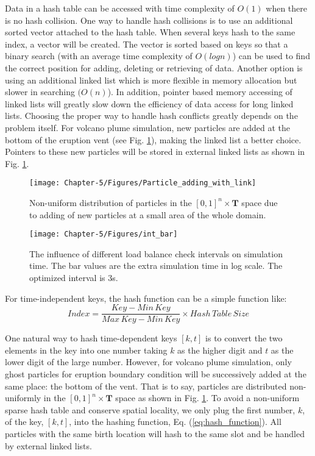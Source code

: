 Data in a hash table can be accessed with time complexity of $O(1)$ when there is no hash collision. One way to handle hash collisions is to use an additional sorted vector attached to the hash table. When several keys hash to the same index, a vector will be created. The vector is sorted based on keys so that a binary search (with an average time complexity of $O(log n)$) can be used to find the correct position for adding, deleting or retrieving of data. Another option is using an additional linked list which is more flexible in memory allocation but slower in searching $(O(n)$). In addition, pointer based memory accessing of linked lists will greatly slow down the efficiency of data access for long linked lists. Choosing the proper way to handle hash conflicts greatly depends on the problem itself. For volcano plume simulation, new particles are added at the bottom of the eruption vent (see Fig. \ref{fig:Particle_adding_with_link}), making the linked list a better choice. Pointers to these new particles will be stored in external linked lists as shown in Fig. \ref{fig:Particle_adding_with_link}.
\begin{figure}
\centering
{\texttt{[image: Chapter-5/Figures/Particle\_adding\_with\_link]}}
{\caption{Non-uniform distribution of particles in the $[0,1]^n \times \textbf{T}$ space due to adding of new particles at a small area of the whole domain.}
\label{fig:Particle_adding_with_link}}
\end{figure}

\begin{figure}
\centering
{\texttt{[image: Chapter-5/Figures/int\_bar]}}
{\caption{The influence of different load balance check intervals on simulation time. The bar values are the extra simulation time in log scale. The optimized interval is 3s.}
\label{fig:check_int}}
\end{figure}

For time-independent keys, the hash function can be a simple function like:
\begin{equation}
Index= \frac{Key - Min\,Key}{Max\,Key - Min\,Key} 
\times Hash\,Table\,Size 
\label{eq:hash_function}
\end{equation}

One natural way to hash time-dependent keys $[k,t]$ is to convert the two elements in the key into one number taking $k$ as the higher digit and $t$ as the lower digit of the large number. However, for volcano plume simulation, only ghost particles for eruption boundary condition will be successively added at the same place: the bottom of the vent. That is to say, particles are distributed non-uniformly in the $[0,1]^n \times \textbf{T}$ space as shown in Fig. \ref{fig:Particle_adding_with_link}. To avoid a non-uniform sparse hash table and conserve spatial locality, we only plug the first number, $k$, of the key, $[k,t]$, into the hashing function, Eq. (\ref{eq:hash_function}). All particles with the same birth location will hash to the same slot and be handled by external linked lists.

